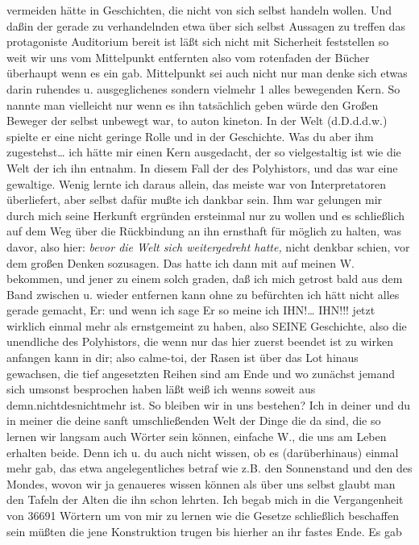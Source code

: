 \documentclass[
]{article}
\begin{document}
vermeiden hätte in Geschichten, die nicht von sich selbst handeln
wollen. Und daßin der gerade zu verhandelnden etwa über sich selbst
Aussagen zu treffen das protagoniste Auditorium bereit ist läßt sich
nicht mit Sicherheit feststellen so weit wir uns vom Mittelpunkt
entfernten also vom rotenfaden der Bücher überhaupt wenn es ein gab.
Mittelpunkt sei auch nicht nur man denke sich etwas darin ruhendes u.
ausgeglichenes sondern vielmehr 1 alles bewegenden Kern. So nannte man
vielleicht nur wenn es ihn tatsächlich geben würde den Großen Beweger
der selbst unbewegt war, to auton kineton. In der Welt (d.D.d.d.w.)
spielte er eine nicht geringe Rolle und in der Geschichte. Was du aber
ihm zugestehst\ldots{} ich hätte mir einen Kern ausgedacht, der so
vielgestaltig ist wie die Welt der ich ihn entnahm. In diesem Fall der
des Polyhistors, und das war eine gewaltige. Wenig lernte ich daraus
allein, das meiste war von Interpretatoren überliefert, aber selbst
dafür mußte ich dankbar sein. Ihm war gelungen mir durch mich seine
Herkunft ergründen ersteinmal nur zu wollen und es schließlich auf dem
Weg über die Rückbindung an ihn ernsthaft für möglich zu halten, was
davor, also hier: \emph{bevor die Welt sich weitergedreht hatte, }nicht
denkbar schien, vor dem großen Denken sozusagen. Das hatte ich dann mit
auf meinen W. bekommen, und jener zu einem solch graden, daß ich mich
getrost bald aus dem Band zwischen u. wieder entfernen kann ohne zu
befürchten ich hätt nicht alles gerade gemacht, Er: und wenn ich sage Er
so meine ich IHN!\ldots{} IHN!!! jetzt wirklich einmal mehr als
ernstgemeint zu haben, also SEINE Geschichte, also die unendliche des
Polyhistors, die wenn nur das hier zuerst beendet ist zu wirken anfangen
kann in dir; also calme-toi, der Rasen ist über das Lot hinaus
gewachsen, die tief angesetzten Reihen sind am Ende und wo zunächst
jemand sich umsonst besprochen haben läßt weiß ich wenns soweit aus
demn.nichtdesnichtmehr ist. So bleiben wir in uns bestehen? Ich in
deiner und du in meiner die deine sanft umschließenden Welt der Dinge
die da sind, die so lernen wir langsam auch Wörter sein können, einfache
W., die uns am Leben erhalten beide. Denn ich u. du auch nicht wissen,
ob es (darüberhinaus) einmal mehr gab, das etwa angelegentliches betraf
wie z.B. den Sonnenstand und den des Mondes, wovon wir ja genaueres
wissen können als über uns selbst glaubt man den Tafeln der Alten die
ihn schon lehrten. Ich begab mich in die Vergangenheit von 36691 Wörtern
um von mir zu lernen wie die Gesetze schließlich beschaffen sein müßten
die jene Konstruktion trugen bis hierher an ihr fastes Ende. Es gab
\end{document}
